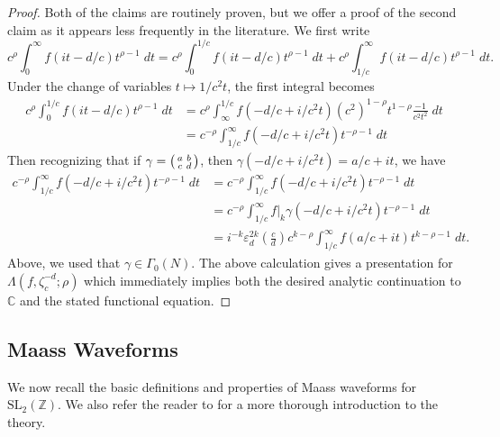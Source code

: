 \documentclass[12pt]{amsart}
\theoremstyle{definition}
\theoremstyle{plain}
\numberwithin{equation}{section}
\begin{document}
 \begin{proof} Both of the claims are routinely proven, but we offer a proof of the second claim as it appears less frequently in the literature. 
We first write 
\[c^\rho \int_0^\infty f(it-d/c) t^{\rho-1}\;dt = c^\rho \int_0^{1/c} f(it-d/c) t^{\rho-1}\;dt + c^\rho \int_{1/c}^{\infty} f(it-d/c) t^{\rho-1}\;dt.
\]	
Under the change of variables $t \mapsto 1/c^2t$, the first integral becomes
\begin{align*}c^\rho \int_0^{1/c} f(it-d/c) t^{\rho-1}\;dt &= c^\rho \int_\infty^{1/c} f(-d/c+i/c^2t)(c^2)^{1-\rho}t^{1-\rho} \frac{-1}{c^2t^2}\;dt \\
&= c^{-\rho} \int_{1/c}^\infty f(-d/c+i/c^2t)t^{-\rho-1} \;dt
\end{align*}
Then recognizing that if $\gamma = \begin{psmallmatrix} a & b \\ c & d\end{psmallmatrix}$, then $\gamma(-d/c+i/c^2t) = a/c + it$, we have
\begin{align*}
c^{-\rho} \int_{1/c}^\infty f(-d/c+i/c^2t)t^{-\rho-1} \;dt 
&= c^{-\rho} \int_{1/c}^\infty f(-d/c+i/c^2t)t^{-\rho-1}\;dt\\ 
&= c^{-\rho} \int_{1/c}^\infty  f|_{k}\gamma(-d/c+i/c^2t)t^{-\rho-1} \;dt \\ 
&= i^{-k}  \varepsilon_d^{2k} \left( \frac{c}{d}\right)  c^{k-\rho} \int_{1/c}^\infty f(a/c+it) t^{k-\rho-1}\;dt.
\end{align*}	
Above, we used that $\gamma \in \Gamma_0(N)$. The above calculation gives a presentation for $\Lambda(f, \zeta_{c}^{-d};\rho)$ which immediately implies both the desired analytic continuation to $\mathbb{C}$ and the stated functional equation. 
\end{proof}


\subsection{Maass Waveforms} \label{subsec: maass}

We now recall the basic definitions and properties of Maass waveforms for $\text{SL}_2(\mathbb{Z})$. We also refer the reader to \cite{bump, iwaniec} for a more thorough introduction to the theory. 
\end{document}
